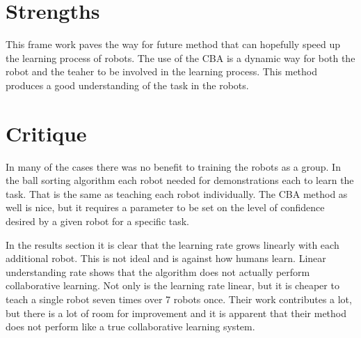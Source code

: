 \documentclass{article}
\begin{document}
\section*{Strengths}
This frame work paves the way for future method that can hopefully speed up the learning process of robots. The use of the CBA is a dynamic way for both the robot and the teaher to be involved in the learning process. This method produces a good understanding of the task in the robots.
\section*{Critique}
In many of the cases there was no benefit to training the robots as a group. In the ball sorting algorithm each robot needed for demonstrations each to learn the task. That is the same as teaching each robot individually. The CBA method as well is nice, but it requires a parameter to be set on the level of confidence desired by a given robot for a specific task.

In the results section it is clear that the learning rate grows linearly with each additional robot. This is not ideal and is against how humans learn. Linear understanding rate shows that the algorithm does not actually perform collaborative learning. Not only is the learning rate linear, but it is cheaper to teach a single robot seven times over 7 robots once. Their work contributes a lot, but there is a lot of room for improvement and it is apparent that their method does not perform like a true collaborative learning system.
\cite{chernova2010confidence}
\end{document}
